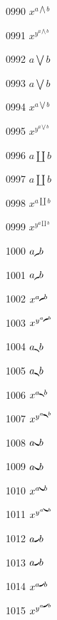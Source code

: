 \documentclass{article}
\begin{document}
0990 $x^{a\bigwedge b}$\par
0991 $x^{y^{a\bigwedge b}}$\par
0992 $a\bigvee b$\par
0993 $\displaystyle a\bigvee b$\par
0994 $x^{a\bigvee b}$\par
0995 $x^{y^{a\bigvee b}}$\par
0996 $a\coprod b$\par
0997 $\displaystyle a\coprod b$\par
0998 $x^{a\coprod b}$\par
0999 $x^{y^{a\coprod b}}$\par
1000 $a\braceld b$\par
1001 $\displaystyle a\braceld b$\par
1002 $x^{a\braceld b}$\par
1003 $x^{y^{a\braceld b}}$\par
1004 $a\bracerd b$\par
1005 $\displaystyle a\bracerd b$\par
1006 $x^{a\bracerd b}$\par
1007 $x^{y^{a\bracerd b}}$\par
1008 $a\bracelu b$\par
1009 $\displaystyle a\bracelu b$\par
1010 $x^{a\bracelu b}$\par
1011 $x^{y^{a\bracelu b}}$\par
1012 $a\braceru b$\par
1013 $\displaystyle a\braceru b$\par
1014 $x^{a\braceru b}$\par
1015 $x^{y^{a\braceru b}}$\par
\end{document}
